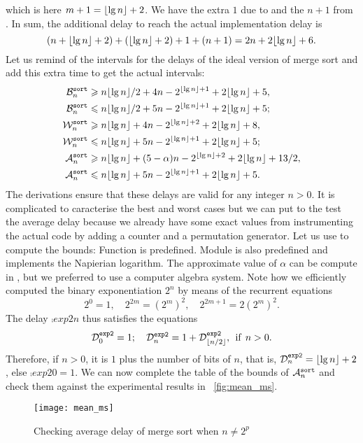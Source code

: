 which is here \(m+1=\floor{\lg n} + 2\). We have the extra \(1\)
due to  and the \(n+1\) from . In sum,
the additional delay to reach the actual implementation delay is
\[
(n + \floor{\lg n} + 2) + (\floor{\lg n} + 2) + 1 + (n+1)
= 2n + 2\floor{\lg n} + 6.
\]
Let us remind of the intervals for the delays of the ideal version of
merge sort and add this extra time to get the actual intervals:
\begin{align}%
\best{sort}{n} &\geqslant n\floor{\lg n}/2 + 4n - 2^{\floor{\lg n}+1} 
    + 2\floor{\lg n} + 5,\notag\\
\best{sort}{n} &\leqslant n\floor{\lg n}/2 + 5n
    - 2^{\floor{\lg n}+1} + 2\floor{\lg n} + 5;\notag\\
\worst{sort}{n} &\geqslant n\floor{\lg n} + 4n - 2^{\floor{\lg n}+2}
   + 2\floor{\lg n} + 8,\notag\\
\worst{sort}{n} &\leqslant n\floor{\lg n} + 5n
                 - 2^{\floor{\lg n}+1} + 2\floor{\lg n} + 5;\notag\\
\ave{sort}{n} &\geqslant n \floor{\lg n} + (5 - \alpha)n
- 2^{\floor{\lg n}+2} + 2\floor{\lg n} + 13/2,\notag\\
\ave{sort}{n} &\leqslant n\floor{\lg n} + 5n - 2^{\floor{\lg n}+1}
               + 2\floor{\lg n} + 5.
\label{ineq:Asort_upper}
\end{align}
The derivations ensure that these delays are valid for any integer
\(n>0\). It is complicated to caracterise the best and worst cases but
we can put to the test the average delay because we already have some
exact values from instrumenting the actual code by adding a counter
and a permutation generator. Let us use \Erlang to compute the bounds:
 Function  is
predefined. Module  is also predefined and
 implements the Napierian logarithm. The
approximate value of \(\alpha\) can be compute in \Erlang, but we
preferred to use a computer algebra system. Note how we efficiently
computed the binary exponentiation \(2^n\) by means of the recurrent
equations
\begin{equation}
2^0 = 1,\quad 2^{2m} = (2^m)^2,\quad 2^{2m+1} =  2(2^m)^2.
\label{def:exp2}
\end{equation}
The delay \(\comp{exp2}{n}\) thus satisfies the equations
\[
\comp{exp2}{0} = 1;\quad \comp{exp2}{n} = 1 +
\comp{exp2}{\floor{n/2}},\;\, \text{if} \;\, n > 0.
\]
Therefore, if \(n>0\), it is \(1\) plus the number of bits of \(n\),
that is, \(\comp{exp2}{n} = \floor{\lg n} + 2\), else \(\comp{exp2}{0} =
1\). We can now complete the table of the bounds of \(\ave{sort}{n}\)
and check them against the experimental results 
in \fig~\vref{fig:mean_ms}.
\begin{figure}
\centering
\texttt{[image: mean\_ms]}
\caption{Checking average delay of merge sort when \(n \neq
  2^p\)\label{fig:mean_ms}}
\end{figure}
\medskip

